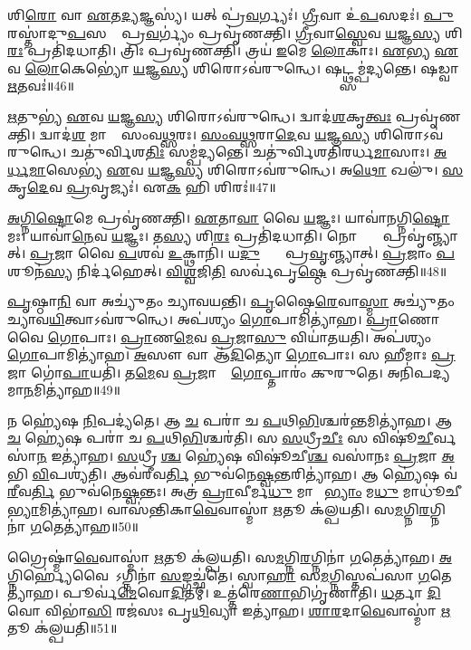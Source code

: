 𑌶𑌿\ul{𑌰𑍋} 𑌵𑌾 \ul{𑌏}𑌤\ul{𑌦𑍍𑌯}𑌜𑍍𑌞𑌸𑍍𑌯॑। 
𑌯𑌤𑍍 𑌪𑍍𑌰॑\ul{𑌵}𑌰𑍍𑌗𑍍𑌯𑌃॑। 
\ul{𑌗𑍍𑌰𑍀}𑌵𑌾 𑌉॑\ul{𑌪}𑌸𑌦𑌃॑। 
\ul{𑌪𑍁}𑌰𑌸𑍍𑌤𑌾॑𑌦𑍁\ul{𑌪}𑌸𑌦𑌾𑌂᳚ 𑌪𑍍𑌰\ul{𑌵}𑌰𑍍𑌗𑍍𑌯𑌂॑ 𑌪𑍍𑌰𑌵𑍃॑𑌣𑌕𑍍𑌤𑌿। 
\ul{𑌗𑍍𑌰𑍀}𑌵𑌾\ul{𑌸𑍍𑌵𑍇}𑌵 \ul{𑌯}𑌜𑍍𑌞\ul{𑌸𑍍𑌯} 𑌶𑌿\ul{𑌰𑌃} 𑌪𑍍𑌰𑌤𑌿॑𑌦𑌧𑌾𑌤𑌿। 
𑌤𑍍𑌰𑌿𑌃 𑌪𑍍𑌰𑌵𑍃॑𑌣𑌕𑍍𑌤𑌿। 
𑌤𑍍𑌰𑌯॑ \ul{𑌇}𑌮𑍇 \ul{𑌲𑍋}𑌕𑌾𑌃। 
\ul{𑌏}𑌭𑍍𑌯 \ul{𑌏}𑌵 \ul{𑌲𑍋}𑌕𑍇𑌭𑍍𑌯𑍋॑ \ul{𑌯}𑌜𑍍𑌞\ul{𑌸𑍍𑌯} 𑌶𑌿𑌰𑍋𑌽𑌵॑𑌰𑍁𑌨𑍍𑌧𑍇। 
𑌷𑌟𑍍𑌥𑍍𑌸𑌮𑍍𑌪॑𑌦𑍍𑌯𑌨𑍍𑌤𑍇। 
𑌷𑌡𑍍𑌵𑌾 \ul{𑌋}𑌤𑌵𑌃॑॥46॥

\ul{𑌋}𑌤𑍁𑌭𑍍𑌯॑ \ul{𑌏}𑌵 \ul{𑌯}𑌜𑍍𑌞\ul{𑌸𑍍𑌯} 𑌶𑌿𑌰𑍋𑌽𑌵॑𑌰𑍁𑌨𑍍𑌧𑍇। 
𑌦𑍍𑌵𑌾𑌦॑\ul{𑌶}𑌕𑍃\ul{𑌤𑍍𑌵𑌃} 𑌪𑍍𑌰𑌵𑍃॑𑌣𑌕𑍍𑌤𑌿। 
𑌦𑍍𑌵𑌾𑌦॑\ul{𑌶} 𑌮𑌾𑌸𑌾𑌃᳚ 𑌸𑌂𑌵\ul{𑌥𑍍𑌸}𑌰𑌃। 
\ul{𑌸𑌂}\ul{𑌵}\ul{𑌥𑍍𑌸}𑌰𑌾\ul{𑌦𑍇}𑌵 \ul{𑌯}𑌜𑍍𑌞\ul{𑌸𑍍𑌯} 𑌶𑌿𑌰𑍋𑌽𑌵॑𑌰𑍁𑌨𑍍𑌧𑍇। 
𑌚𑌤𑍁॑𑌰𑍍𑌵𑌿𑌶\ul{𑌤𑌿𑌃} 𑌸𑌮𑍍𑌪॑𑌦𑍍𑌯𑌨𑍍𑌤𑍇। 
𑌚𑌤𑍁॑𑌰𑍍𑌵𑌿𑌶𑌤𑌿𑌰𑌰𑍍𑌧\ul{𑌮𑌾}𑌸𑌾𑌃। 
\ul{𑌅}\ul{𑌰𑍍𑌧}\ul{𑌮𑌾}𑌸𑍇𑌭𑍍𑌯॑ \ul{𑌏}𑌵 \ul{𑌯}𑌜𑍍𑌞\ul{𑌸𑍍𑌯} 𑌶𑌿𑌰𑍋𑌽𑌵॑𑌰𑍁𑌨𑍍𑌧𑍇। 
𑌅\ul{𑌥𑍋} 𑌖𑌲𑍁॑। 
\ul{𑌸}𑌕𑍃\ul{𑌦𑍇}𑌵 \ul{𑌪𑍍𑌰}𑌵𑍃𑌜𑍍𑌯𑌃॑। 
𑌏\ul{𑌕}\ul{} 𑌹𑌿 𑌶𑌿𑌰𑌃॑॥47॥

\ul{𑌅}\ul{𑌗𑍍𑌨𑌿}\ul{𑌷𑍍𑌟𑍋}𑌮𑍇 𑌪𑍍𑌰𑌵𑍃॑𑌣𑌕𑍍𑌤𑌿। 
\ul{𑌏}𑌤𑌾\ul{𑌵𑌾}\an{} 𑌵𑍈 \ul{𑌯}𑌜𑍍𑌞𑌃। 
𑌯𑌾𑌵𑌾॑𑌨𑌗𑍍𑌨𑌿\ul{𑌷𑍍𑌟𑍋}𑌮𑌃। 
𑌯𑌾𑌵𑌾॑\ul{𑌨𑍇}𑌵 \ul{𑌯}𑌜𑍍𑌞𑌃। 
𑌤\ul{𑌸𑍍𑌯} 𑌶𑌿\ul{𑌰𑌃} 𑌪𑍍𑌰𑌤𑌿॑𑌦𑌧𑌾𑌤𑌿। 
𑌨𑍋𑌕𑍍𑌥𑍍𑌯𑍇᳚ 𑌪𑍍𑌰𑌵𑍃॑𑌞𑍍𑌜𑍍𑌯𑌾𑌤𑍍। 
\ul{𑌪𑍍𑌰}𑌜𑌾 𑌵𑍈 \ul{𑌪}𑌶𑌵॑ \ul{𑌉}𑌕𑍍𑌥𑌾𑌨𑌿॑। 
𑌯\ul{𑌦𑍁}𑌕𑍍𑌥𑍍𑌯𑍇᳚ 𑌪𑍍𑌰\ul{𑌵𑍃}𑌞𑍍𑌜𑍍𑌯𑌾𑌤𑍍। 
\ul{𑌪𑍍𑌰}𑌜𑌾𑌂 \ul{𑌪}𑌶𑍂𑌨॑\ul{𑌸𑍍𑌯} 𑌨𑌿𑌰𑍍𑌦॑𑌹𑍇𑌤𑍍। 
\ul{𑌵𑌿}\ul{𑌶𑍍𑌵}𑌜𑌿\ul{𑌤𑌿} 𑌸𑌰𑍍𑌵॑𑌪𑍃\ul{𑌷𑍍𑌠𑍇} 𑌪𑍍𑌰𑌵𑍃॑𑌣𑌕𑍍𑌤𑌿॥48॥

\ul{𑌪𑍃}𑌷𑍍𑌠𑌾\ul{𑌨𑌿} 𑌵𑌾 𑌅𑌚𑍍𑌯𑍁॑𑌤𑌂 𑌚𑍍𑌯𑌾𑌵𑌯𑌨𑍍𑌤𑌿। 
\ul{𑌪𑍃}𑌷𑍍𑌠𑍈\ul{𑌰𑍇}𑌵𑌾\ul{𑌸𑍍𑌮𑌾} 𑌅𑌚𑍍𑌯𑍁॑𑌤𑌂 𑌚𑍍𑌯𑌾𑌵\ul{𑌯𑌿}𑌤𑍍𑌵𑌾𑌽𑌵॑𑌰𑍁𑌨𑍍𑌧𑍇। 
𑌅𑌪॑𑌶𑍍𑌯𑌂 \ul{𑌗𑍋}𑌪𑌾𑌮𑌿𑌤𑍍𑌯𑌾॑𑌹। 
\ul{𑌪𑍍𑌰𑌾}𑌣𑍋 𑌵𑍈 \ul{𑌗𑍋}𑌪𑌾𑌃। 
\ul{𑌪𑍍𑌰𑌾}𑌣\ul{𑌮𑍇}𑌵 \ul{𑌪𑍍𑌰}𑌜𑌾\ul{𑌸𑍁} 𑌵𑌿𑌯𑌾॑𑌤𑌯𑌤𑌿। 
𑌅𑌪॑𑌶𑍍𑌯𑌂 \ul{𑌗𑍋}𑌪𑌾𑌮𑌿𑌤𑍍𑌯𑌾॑𑌹। 
\ul{𑌅}𑌸𑍗 𑌵𑌾 𑌆॑\ul{𑌦𑌿}𑌤𑍍𑌯𑍋 \ul{𑌗𑍋}𑌪𑌾𑌃। 
𑌸 𑌹𑍀𑌮𑌾𑌃 \ul{𑌪𑍍𑌰}𑌜𑌾 𑌗𑍋॑\ul{𑌪𑌾}𑌯𑌤𑌿॑। 
𑌤\ul{𑌮𑍇}𑌵 \ul{𑌪𑍍𑌰}𑌜𑌾𑌨𑌾𑌂᳚ \ul{𑌗𑍋}𑌪𑍍𑌤𑌾𑌰𑌂॑ 𑌕𑍁𑌰𑍁𑌤𑍇। 
𑌅𑌨𑌿॑𑌪𑌦𑍍𑌯𑌮𑌾\ul{𑌨}𑌮𑌿𑌤𑍍𑌯𑌾॑𑌹॥49॥

𑌨 𑌹𑍍𑌯𑍇॑𑌷 \ul{𑌨𑌿}𑌪𑌦𑍍𑌯॑𑌤𑍇। 
𑌆 \ul{𑌚} 𑌪𑌰𑌾॑ 𑌚 \ul{𑌪}𑌥𑌿\ul{𑌭𑌿}𑌶𑍍𑌚𑌰॑\ul{𑌨𑍍𑌤}𑌮𑌿𑌤𑍍𑌯𑌾॑𑌹। 
𑌆 \ul{𑌚} 𑌹𑍍𑌯𑍇॑𑌷 𑌪𑌰𑌾॑ 𑌚 \ul{𑌪}𑌥𑌿\ul{𑌭𑌿}𑌶𑍍𑌚𑌰॑𑌤𑌿। 
𑌸 \ul{𑌸}𑌧𑍍𑌰𑍀\ul{𑌚𑍀𑌃} 𑌸 𑌵𑌿𑌷𑍂॑\ul{𑌚𑍀}𑌰𑍍𑌵𑌸𑌾॑\ul{𑌨} 𑌇𑌤𑍍𑌯𑌾॑𑌹। 
\ul{𑌸}𑌧𑍍𑌰𑍀𑌚𑍀᳚\ul{𑌶𑍍𑌚} 𑌹𑍍𑌯𑍇॑𑌷 𑌵𑌿𑌷𑍂॑𑌚𑍀\ul{𑌶𑍍𑌚} 𑌵𑌸𑌾॑𑌨𑌃 \ul{𑌪𑍍𑌰}𑌜𑌾 \ul{𑌅}𑌭𑌿 \ul{𑌵𑌿}𑌪𑌶𑍍𑌯॑𑌤𑌿। 
𑌆𑌵॑𑌰𑍀𑌵\ul{𑌰𑍍𑌤𑌿} 𑌭𑍁𑌵॑𑌨𑍇\ul{𑌷𑍍𑌵}𑌨𑍍𑌤𑌰𑌿𑌤𑍍𑌯𑌾॑𑌹। 
𑌆 𑌹𑍍𑌯𑍇॑𑌷 𑌵॑\ul{𑌰𑍀}𑌵\ul{𑌰𑍍𑌤𑌿} 𑌭𑍁𑌵॑𑌨𑍇\ul{𑌷𑍍𑌵}𑌨𑍍𑌤𑌃। 
𑌅𑌤𑍍𑌰॑ \ul{𑌪𑍍𑌰𑌾}𑌵𑍀𑌰𑍍𑌮\ul{𑌧𑍁} 𑌮𑌾𑌧𑍍𑌵𑍀᳚\ul{𑌭𑍍𑌯𑌾𑌂} 𑌮\ul{𑌧𑍁} 𑌮𑌾𑌧𑍂॑𑌚𑍀\ul{𑌭𑍍𑌯𑌾}𑌮𑌿𑌤𑍍𑌯𑌾॑𑌹। 
𑌵𑌾𑌸॑𑌨𑍍𑌤𑌿𑌕𑌾\ul{𑌵𑍇}𑌵𑌾𑌸𑍍𑌮𑌾॑ \ul{𑌋}𑌤𑍂 𑌕॑𑌲𑍍𑌪𑌯𑌤𑌿। 
𑌸\ul{𑌮}𑌗𑍍𑌨𑌿\ul{𑌰}𑌗𑍍𑌨𑌿𑌨𑌾॑ \ul{𑌗}𑌤𑍇𑌤𑍍𑌯𑌾॑𑌹॥50॥

𑌗𑍍𑌰𑍈𑌷𑍍𑌮𑌾॑\ul{𑌵𑍇}𑌵𑌾𑌸𑍍𑌮𑌾॑ \ul{𑌋}𑌤𑍂 𑌕॑𑌲𑍍𑌪𑌯𑌤𑌿। 
𑌸\ul{𑌮}𑌗𑍍𑌨𑌿\ul{𑌰}𑌗𑍍𑌨𑌿𑌨𑌾॑ \ul{𑌗}𑌤𑍇𑌤𑍍𑌯𑌾॑𑌹। 
\ul{𑌅}𑌗𑍍𑌨𑌿𑌰𑍍𑌹𑍍𑌯𑍇॑𑌵𑍈𑌷𑍋᳚𑌽𑌗𑍍𑌨𑌿𑌨𑌾॑ \ul{𑌸}𑌙𑍍𑌗𑌚𑍍𑌛॑𑌤𑍇। 
𑌸𑍍𑌵𑌾\ul{𑌹𑌾} 𑌸\ul{𑌮}𑌗𑍍𑌨𑌿𑌸𑍍𑌤𑌪॑𑌸𑌾 \ul{𑌗}𑌤𑍇𑌤𑍍𑌯𑌾॑𑌹। 
𑌪𑍂𑌰𑍍𑌵॑\ul{𑌮𑍇}𑌵𑍋\ul{𑌦𑌿}𑌤𑌮𑍍। 
𑌉𑌤𑍍𑌤॑𑌰𑍇\ul{𑌣𑌾}𑌭𑌿𑌗𑍃॑𑌣𑌾𑌤𑌿। 
\ul{𑌧}𑌰𑍍𑌤𑌾 \ul{𑌦𑌿}𑌵𑍋 𑌵𑌿𑌭𑌾॑\ul{𑌸𑌿} 𑌰𑌜॑𑌸𑌃 𑌪𑍃\ul{𑌥𑌿}𑌵𑍍𑌯𑌾 𑌇𑌤𑍍𑌯𑌾॑𑌹। 
\ul{𑌶𑌾}\ul{𑌰}𑌦𑌾\ul{𑌵𑍇}𑌵𑌾𑌸𑍍𑌮𑌾॑ \ul{𑌋}𑌤𑍂 𑌕॑𑌲𑍍𑌪𑌯𑌤𑌿॥51॥


